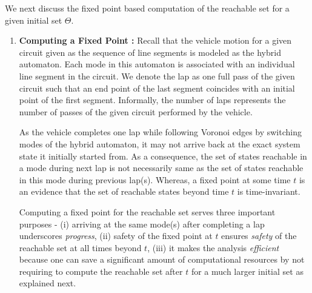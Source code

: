 We next discuss the fixed point based computation of the reachable set for a given initial set $\Theta$.


\begin{enumerate}[wide, labelindent=0pt]
\item \textbf{Computing a Fixed Point :} Recall that the vehicle motion for a given circuit given as the sequence of line segments is modeled as the hybrid automaton. Each mode in this automaton is associated with an individual line segment in the circuit.
%
We denote the lap as one full pass of the given circuit such that an end point of the last segment coincides with an initial point of the first segment. Informally, the number of laps represents the number of passes of the given circuit performed by the vehicle.
%

As the vehicle completes one lap while following Voronoi edges by switching modes of the hybrid automaton, it may not arrive back at the exact system state it initially started from. As a consequence, the set of states reachable in a mode during next lap is not necessarily same as the set of states reachable in this mode during previous lap(s). Whereas, a fixed point at some time $t$ is an evidence that the set of reachable states beyond time $t$ is time-invariant. 

Computing a fixed point for the reachable set serves three important purposes - (i) arriving at the same mode(s) after completing a lap underscores \emph{progress}, (ii) safety of the fixed point at $t$ ensures \emph{safety} of the reachable set at all times beyond $t$, (iii) it makes the analysis \emph{efficient} because one can save a significant amount of computational resources by not requiring to compute the reachable set after $t$ for a much larger initial set as explained next.

%
%


\end{enumerate}

